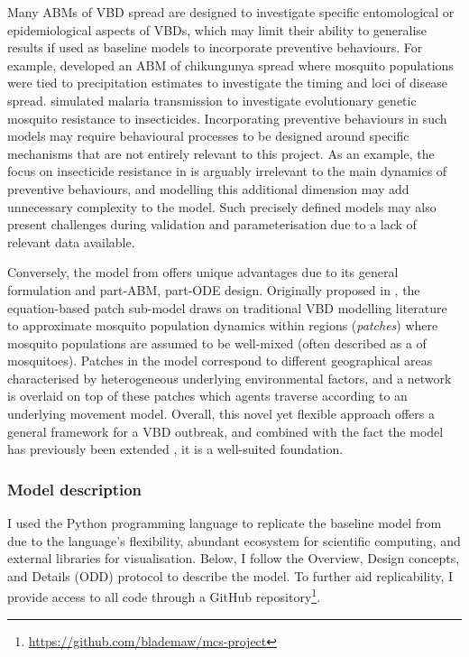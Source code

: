 Many ABMs of VBD spread are designed to investigate specific entomological or epidemiological aspects of VBDs, which may limit their ability to generalise results if used as baseline models to incorporate preventive behaviours. For example, \citet{dommar_agent-based_2014} developed an ABM of chikungunya spread where mosquito populations were tied to precipitation estimates to investigate the timing and loci of disease spread. \citet{selvaraj_vector_2020} simulated malaria transmission to investigate evolutionary genetic mosquito resistance to insecticides. Incorporating preventive behaviours in such models may require behavioural processes to be designed around specific mechanisms that are not entirely relevant to this project. As an example, the focus on insecticide resistance in \citet{selvaraj_vector_2020} is arguably irrelevant to the main dynamics of preventive behaviours, and modelling this additional dimension may add unnecessary complexity to the model. Such precisely defined models may also present challenges during validation and parameterisation due to a lack of relevant data available.

Conversely, the model from \citet{manore_network-patch_2015} offers unique advantages due to its general formulation and part-ABM, part-ODE design. Originally proposed in \citet{mniszewski_towards_2014}, the equation-based patch sub-model draws on traditional VBD modelling literature to approximate mosquito population dynamics within regions (\textit{patches}) where mosquito populations are assumed to be well-mixed (often described as a  of mosquitoes). Patches in the model correspond to different geographical areas characterised by heterogeneous underlying environmental factors, and a network is overlaid on top of these patches which agents traverse according to an underlying movement model. Overall, this novel yet flexible approach offers a general framework for a VBD outbreak, and combined with the fact the model has previously been extended \cite{mateus_c_modeling_2021}, it is a well-suited foundation.

\subsubsection{Model description}\label{sec:baseline-model-description}

I used the Python programming language to replicate the baseline model from \citet{manore_network-patch_2015} due to the language's flexibility, abundant ecosystem for scientific computing, and external libraries for visualisation. Below, I follow the Overview, Design concepts, and Details (ODD) protocol \cite{grimm_standard_2006,grimm_odd_2020} to describe the model. To further aid replicability, I provide access to all code through a GitHub repository\footnote{\url{https://github.com/blademaw/mcs-project}}.

